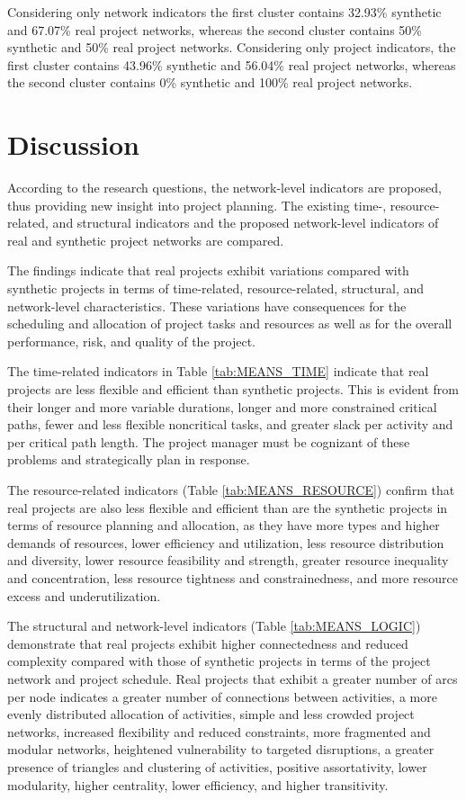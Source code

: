 \documentclass[preprint,
3p]{elsarticle} %
\begin{document}
Considering only network indicators the first cluster contains 32.93\%
synthetic and 67.07\% real project networks, whereas the second cluster
contains 50\% synthetic and 50\% real project networks. Considering only
project indicators, the first cluster contains 43.96\% synthetic and
56.04\% real project networks, whereas the second cluster contains 0\%
synthetic and 100\% real project networks.

\section{Discussion}\label{sec:discussion}

According to the research questions, the network-level indicators are
proposed, thus providing new insight into project planning. The existing
time-, resource-related, and structural indicators and the proposed
network-level indicators of real and synthetic project networks are
compared.

The findings indicate that real projects exhibit variations compared
with synthetic projects in terms of time-related, resource-related,
structural, and network-level characteristics. These variations have
consequences for the scheduling and allocation of project tasks and
resources as well as for the overall performance, risk, and quality of
the project.

The time-related indicators in Table \ref{tab:MEANS_TIME} indicate that
real projects are less flexible and efficient than synthetic projects.
This is evident from their longer and more variable durations, longer
and more constrained critical paths, fewer and less flexible noncritical
tasks, and greater slack per activity and per critical path length. The
project manager must be cognizant of these problems and strategically
plan in response.

The resource-related indicators (Table \ref{tab:MEANS_RESOURCE}) confirm
that real projects are also less flexible and efficient than are the
synthetic projects in terms of resource planning and allocation, as they
have more types and higher demands of resources, lower efficiency and
utilization, less resource distribution and diversity, lower resource
feasibility and strength, greater resource inequality and concentration,
less resource tightness and constrainedness, and more resource excess
and underutilization.

The structural and network-level indicators (Table
\ref{tab:MEANS_LOGIC}) demonstrate that real projects exhibit higher
connectedness and reduced complexity compared with those of synthetic
projects in terms of the project network and project schedule. Real
projects that exhibit a greater number of arcs per node indicates a
greater number of connections between activities, a more evenly
distributed allocation of activities, simple and less crowded project
networks, increased flexibility and reduced constraints, more fragmented
and modular networks, heightened vulnerability to targeted disruptions,
a greater presence of triangles and clustering of activities, positive
assortativity, lower modularity, higher centrality, lower efficiency,
and higher transitivity.
\end{document}
